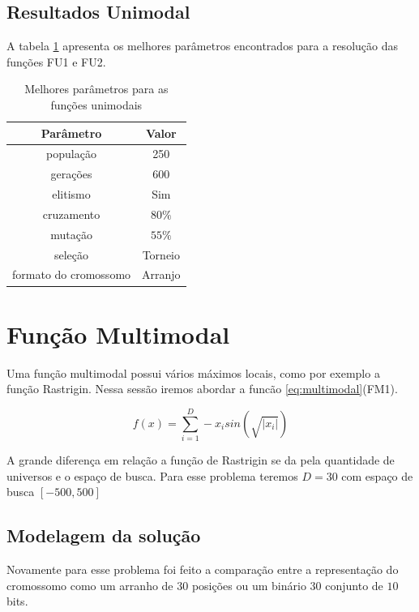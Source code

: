 \documentclass[conference]{IEEEtran}
\begin{document}
\subsection{Resultados Unimodal}

A tabela \ref{tab:melhor_parametros_unimodas} apresenta os melhores parâmetros encontrados para a resolução das funções FU1 e FU2.

\begin{table}[h]
\renewcommand{\arraystretch}{1.3}
\caption{Melhores parâmetros para as funções unimodais}
\label{tab:melhor_parametros_unimodas}
\centering
\begin{tabular}{c|c}
\hline
Parâmetro & Valor\\
\hline
população & 250 \\
gerações & 600 \\
elitismo & Sim \\
cruzamento & $80\%$ \\
mutação & $55\%$ \\
seleção & Torneio \\
formato do cromossomo & Arranjo \\
\end{tabular}
\end{table}

\section{Função Multimodal}

Uma função multimodal possui vários máximos locais, como por exemplo a função Rastrigin. Nessa sessão iremos abordar a funcão \ref{eq:multimodal}(FM1). 

\begin{equation}\label{eq:multimodal}
f(x) = \sum_{i=1}^D -x_{i} sin(\sqrt{|x_{i}|})
\end{equation}

A grande diferença em relação a função de Rastrigin se da pela quantidade de universos e o espaço de busca. Para esse problema teremos $D=30$ com espaço de busca $[-500, 500]$

\subsection{Modelagem da solução}

Novamente para esse problema foi feito a comparação entre a representação do cromossomo como um arranho de $30$ posições ou um binário $30$ conjunto de $10$ bits.
\end{document}
